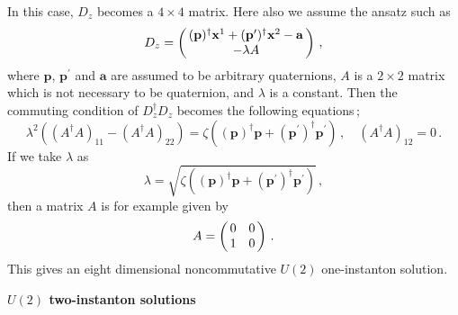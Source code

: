 \documentclass[a4paper,12pt]{article}
\begin{document}
In this case, $D_z$ becomes a $4\times 4$ matrix. 
Here also we assume the ansatz such as
\begin{equation}
D_z =
 \left( \begin{array}{@{\,}c@{\,}}
 (\mathbf{p})^{\dagger}\mathbf{x}^1 +(\mathbf{p}^{\prime})^{\dagger}
\mathbf{x}^2
 -\mathbf{a}\\
   -\lambda A   
  \end{array}  \right)\,,
\end{equation}
where $\mathbf{p}$, $\mathbf{p}^{\prime}$ 
and $\mathbf{a}$ are assumed 
to be arbitrary quaternions, 
 $A$ is a $2\times 2$ matrix which is not necessary to 
be quaternion, and $\lambda$ is a constant.
Then the commuting condition of $D_z^{\dagger}D_z$ becomes the following 
equations\,;
\begin{equation}
\lambda^2 \left( ( A^{\dagger}A)_{11}-(A^{\dagger}A)_{22}\right)= 
\zeta \left( (\mathbf{p})^{\dagger}\mathbf{p} + (\mathbf{p}^{\prime})^{\dagger}
\mathbf{p}^{\prime} \right)\,,\quad ( A^{\dagger}A)_{12}=0\,.
\end{equation}
If we take $\lambda$ as
\begin{equation}
\lambda =\sqrt{ \zeta \left( (\mathbf{p})^{\dagger}\mathbf{p} 
+(\mathbf{p}^{\prime})^{\dagger}\mathbf{p}^{\prime} \right) }\,,
\end{equation}
then a matrix $A$ is for example given by
\begin{equation}
A=
\left( \begin{array}{@{\,}cc@{\,}}
 0   &    0     \\
  1    &   0 
  \end{array}  \right)\,.
\end{equation}
This gives an eight dimensional noncommutative 
$U(2)$ one-instanton solution.


\begin{flushleft}
\textbf{$U(2)$ two-instanton solutions}
\end{flushleft}
\end{document}
